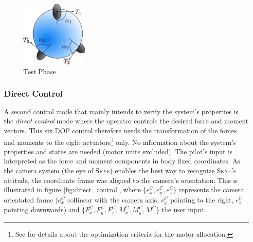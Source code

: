 \begin{figure}[H] %
	\begin{center}
		\includegraphics[width=0.3\textwidth]{TPC.eps}
		\caption[Test Phase]{Test Phase}  
		\label{fig:test_phase}		
	\end{center}
\end{figure}


\subsubsection{Direct Control} 
A second control mode that mainly intends to verify the system's properties is the \textit{direct control} mode where the operator controls the desired force and moment vectors. This six DOF control therefore needs the transformation of the forces and moments to the eight actuators\footnote{See \cite{schaffnervu} for details about the optimization criteria for the motor allocation.} only. No information about the system's properties and states are needed (motor units excluded). The pilot's input is interpreted as the force and moment components in body fixed coordinates. As the camera system (the eye of \textsc{Skye}) enables the best way to recognize \textsc{Skye}'s attitude, the coordinate frame was aligned to the camera's orientation. This is illustrated in figure \ref{fig:direct_control}, where $\{e_x^C, e_y^C, e_z^C\}$ represents the camera orientated frame ($e_x^C$ collinear with the camera axis, $e_y^C$ pointing to the right, $e_z^C$  pointing downwards) and $\{F_x^C, F_y^C, F_z^C, M_x^C, M_y^C, M_z^C\}$ the user input.


